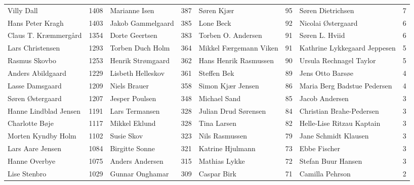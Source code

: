\begin{table*}[h]
\begin{tabular}{l|c|l|c|l|c|l|c}
		Villy Dall            &  1408  & Marianne Isen              &  387   & Søren Kjær                   &   95   & Søren Dietrichsen            &   7    \\
		Hans Peter Kragh      &  1403  & Jakob Gammelgaard          &  385   & Lone Beck                    &   92   & Nicolai Østergaard           &   6    \\
		Claus T. Kræmmergård  &  1354  & Dorte Geertsen             &  383   & Torben O. Andersen           &   91   & Søren L. Hviid               &   6    \\
		Lars Christensen      &  1293  & Torben Duch Holm           &  364   & Mikkel Færgemann Viken       &   91   & Kathrine Lykkegaard Jeppesen &   5    \\
		Rasmus Skovbo         &  1253  & Henrik Strømgaard          &  362   & Hans Henrik Rasmussen        &   90   & Ursula Rechnagel Taylor      &   5    \\
		Anders Abildgaard     &  1229  & Lisbeth Helleskov          &  361   & Steffen Bek                  &   89   & Jens Otto Barsøe             &   4    \\
		Lasse Damsgaard       &  1209  & Niels Brauer               &  358   & Simon Kjær Jensen            &   86   & Maria Berg Badstue Pedersen  &   4    \\
		Søren Østergaard      &  1207  & Jesper Poulsen             &  348   & Michael Sand                 &   85   & Jacob Andersen               &   3    \\
		Hanne Lindblad Jensen &  1191  & Lars Termansen             &  328   & Julian Drud Sørensen         &   84   & Christian Brahe-Pedersen     &   3    \\
		Charlotte Bøje        &  1117  & Mikkel Eklund              &  328   & Tina Larsen                  &   82   & Helle-Lise Ritzau Kaptain    &   3    \\
		Morten Kyndby Holm    &  1102  & Susie Skov                 &  323   & Nils Rasmussen               &   79   & Jane Schmidt Klausen         &   3    \\
		Lars Aare Jensen      &  1084  & Birgitte Sonne             &  321   & Katrine Hjulmann             &   73   & Ebbe Fischer                 &   3    \\
		Hanne Overbye         &  1075  & Anders Andersen            &  315   & Mathias Lykke                &   72   & Stefan Buur Hansen           &   3    \\
		Lise Stenbro          &  1029  & Gunnar Onghamar            &  309   & Caspar Birk                  &   71   & Camilla Pehrson              &   2    \\

\end{tabular}
\end{table*}
